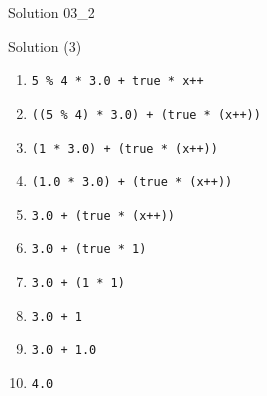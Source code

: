 \ifnum\conditionmacro=1 \documentclass[handout,usenames,dvipsnames]{beamer}\fi
\begin{document}
\begin{frame}[fragile]{Solution 03\_2}
\begin{block}{Solution (3)}
\begin{enumerate}
\item \verb,5 % 4 * 3.0 + true * x++,
\item<2-> \verb,((5 % 4) * 3.0) + (true * (x++)),
\item<3-> \verb,(1 * 3.0) + (true * (x++)),
\item<4-> \verb,(1.0 * 3.0) + (true * (x++)),
\item<5-> \verb,3.0 + (true * (x++)),
\item<6-> \verb,3.0 + (true * 1),
\item<7-> \verb,3.0 + (1 * 1),
\item<8-> \verb,3.0 + 1,
\item<9-> \verb,3.0 + 1.0,
\item<10-> \verb,4.0,
\end{enumerate}
\end{block}
\end{frame}
\end{document}
